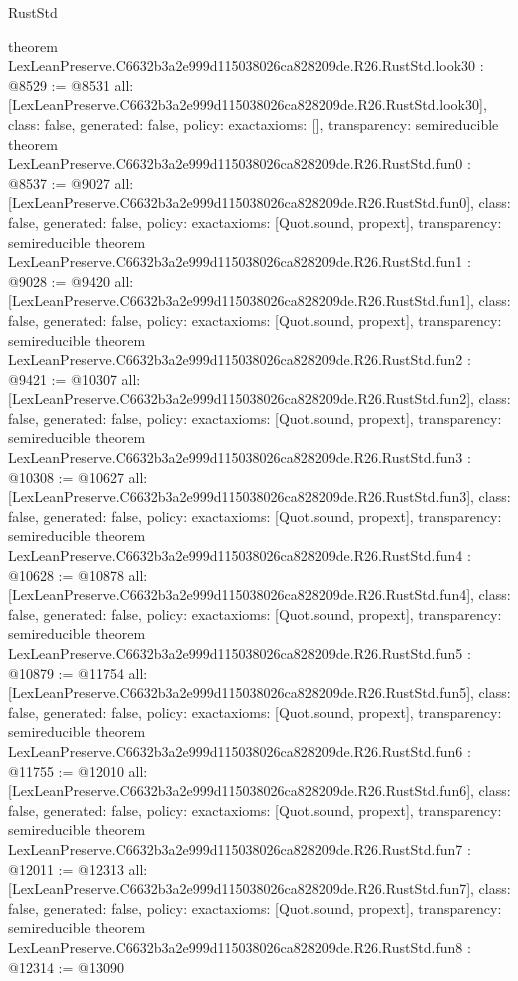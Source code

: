 \begin{lexlean}{RustStd}
\begin{coremodule}
{}
theorem LexLeanPreserve.C6632b3a2e999d115038026ca828209de.R26.RustStd.look30 : @8529 := @8531 {
  all: [LexLeanPreserve.C6632b3a2e999d115038026ca828209de.R26.RustStd.look30],
  class: false,
  generated: false,
  policy: exact{axioms: []},
  transparency: semireducible
}
theorem LexLeanPreserve.C6632b3a2e999d115038026ca828209de.R26.RustStd.fun0 : @8537 := @9027 {
  all: [LexLeanPreserve.C6632b3a2e999d115038026ca828209de.R26.RustStd.fun0],
  class: false,
  generated: false,
  policy: exact{axioms: [Quot.sound, propext]},
  transparency: semireducible
}
theorem LexLeanPreserve.C6632b3a2e999d115038026ca828209de.R26.RustStd.fun1 : @9028 := @9420 {
  all: [LexLeanPreserve.C6632b3a2e999d115038026ca828209de.R26.RustStd.fun1],
  class: false,
  generated: false,
  policy: exact{axioms: [Quot.sound, propext]},
  transparency: semireducible
}
theorem LexLeanPreserve.C6632b3a2e999d115038026ca828209de.R26.RustStd.fun2 : @9421 := @10307 {
  all: [LexLeanPreserve.C6632b3a2e999d115038026ca828209de.R26.RustStd.fun2],
  class: false,
  generated: false,
  policy: exact{axioms: [Quot.sound, propext]},
  transparency: semireducible
}
theorem LexLeanPreserve.C6632b3a2e999d115038026ca828209de.R26.RustStd.fun3 : @10308 := @10627 {
  all: [LexLeanPreserve.C6632b3a2e999d115038026ca828209de.R26.RustStd.fun3],
  class: false,
  generated: false,
  policy: exact{axioms: [Quot.sound, propext]},
  transparency: semireducible
}
theorem LexLeanPreserve.C6632b3a2e999d115038026ca828209de.R26.RustStd.fun4 : @10628 := @10878 {
  all: [LexLeanPreserve.C6632b3a2e999d115038026ca828209de.R26.RustStd.fun4],
  class: false,
  generated: false,
  policy: exact{axioms: [Quot.sound, propext]},
  transparency: semireducible
}
theorem LexLeanPreserve.C6632b3a2e999d115038026ca828209de.R26.RustStd.fun5 : @10879 := @11754 {
  all: [LexLeanPreserve.C6632b3a2e999d115038026ca828209de.R26.RustStd.fun5],
  class: false,
  generated: false,
  policy: exact{axioms: [Quot.sound, propext]},
  transparency: semireducible
}
theorem LexLeanPreserve.C6632b3a2e999d115038026ca828209de.R26.RustStd.fun6 : @11755 := @12010 {
  all: [LexLeanPreserve.C6632b3a2e999d115038026ca828209de.R26.RustStd.fun6],
  class: false,
  generated: false,
  policy: exact{axioms: [Quot.sound, propext]},
  transparency: semireducible
}
theorem LexLeanPreserve.C6632b3a2e999d115038026ca828209de.R26.RustStd.fun7 : @12011 := @12313 {
  all: [LexLeanPreserve.C6632b3a2e999d115038026ca828209de.R26.RustStd.fun7],
  class: false,
  generated: false,
  policy: exact{axioms: [Quot.sound, propext]},
  transparency: semireducible
}
theorem LexLeanPreserve.C6632b3a2e999d115038026ca828209de.R26.RustStd.fun8 : @12314 := @13090 {
}
\end{coremodule}
\end{lexlean}
